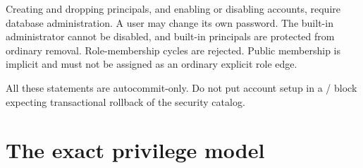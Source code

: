 Creating and dropping principals, and enabling or disabling accounts, require
database administration. A user may change its own password. The built-in
administrator cannot be disabled, and built-in principals are protected from
ordinary removal. Role-membership cycles are rejected. Public membership is
implicit and must not be assigned as an ordinary explicit role edge.

All these statements are autocommit-only. Do not put account setup in a
/ block expecting transactional rollback of the
security catalog.


\section{The exact privilege model}


